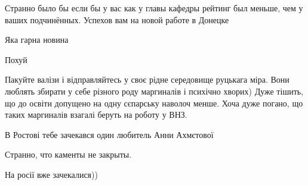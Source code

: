 \begin{itemize}
Странно было бы если бы у вас как у главы кафедры рейтинг был меньше, чем у ваших подчинённых. Успехов вам на новой работе в Донецке

 
Яка гарна новина 🤗

 
Похуй

 
Пакуйте валізи і відправляйтесь у своє рідне середовище руцькага міра. Вони люблять збирати у себе різного роду маргиналів і психічно хворих) Дуже тішить, що до освіти допущено на одну сєпарську наволоч менше. Хоча дуже погано, що таких маргиналів взагалі беруть на роботу у ВНЗ.

 
В Ростові тебе зачекався один любитель Анни Ахмєтової

 
Странно, что каменты не закрыты.

 
На росії вже зачекалися))

 

\end{itemize}
